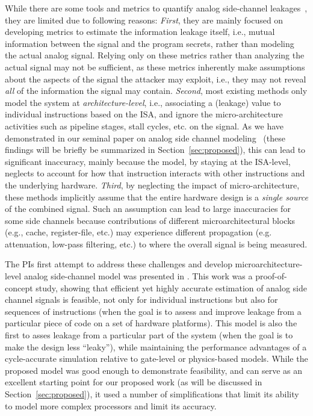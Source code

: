 \documentclass[11 pt]{article}
\begin{document}
While there are some tools and metrics to quantify analog side-channel leakages~\cite{Demme:2013:FOM:2485922.2485970,Callan:2014:PMM:2742155.2742179,McCann:2017:TPT:3241189.3241207,Barenghi:2018:SSS:3195970.3196112, yilmaz17tifs}, they are limited due to following reasons: \textit{First}, they are mainly focused on developing metrics to estimate the information leakage itself, i.e., mutual information between the signal and the program secrets, rather than modeling the actual analog signal. Relying only on these metrics rather than analyzing the actual signal may not be sufficient, as these metrics inherently make assumptions about the aspects of the signal the attacker may exploit, i.e., they may not reveal \emph{all} of the information the signal may contain. \textit{Second}, most existing methods only model the system at \textit{architecture-level}, i.e., associating a (leakage) value to individual instructions based on the ISA, and ignore the micro-architecture activities such as pipeline stages, stall cycles, etc. on the signal. As we have demonstrated in our seminal paper on analog side channel modeling~\cite{Nader2020} (these findings will be briefly be summarized in Section~\ref{sec:proposed}), this can lead to significant inaccuracy, mainly because the model, by staying at the ISA-level, neglects to account for how that instruction interacts with other instructions and the underlying hardware.  \textit{Third}, by neglecting the impact of micro-architecture, these methods implicitly assume that the entire hardware design is a \textit{single source} of the combined signal. Such an assumption can lead to large inaccuracies for some side channels because contributions of different microarchitectural blocks (e.g., cache, register-file, etc.) may experience different propagation (e.g. attenuation, low-pass filtering, etc.) to where the overall signal is being measured.

The PIs first attempt to address these challenges and develop microarchitecture-level analog side-channel model was presented in \cite{Nader2020}. This work was a proof-of-concept study, showing that efficient yet highly accurate estimation of analog side channel signals is feasible, not only for individual instructions but also for sequences of instructions (when the goal is to assess and improve leakage from a particular piece of code on a set of hardware platforms). This model is also the first to asses leakage from a particular part of the system (when the goal is to make the design less ``leaky''), while maintaining the performance advantages of a cycle-accurate simulation relative to gate-level or physics-based models. While the proposed model was good enough to demonstrate feasibility, and can serve as an excellent starting point for our proposed work (as will be discussed in Section~\ref{sec:proposed}), it used a number of simplifications that limit its ability to model more complex processors and limit its accuracy.
\end{document}
